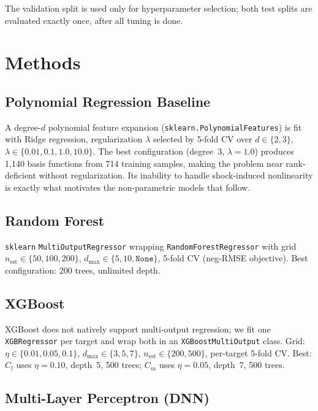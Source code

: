 \documentclass[11pt]{article}
\begin{document}
The validation split is used only for hyperparameter selection; both test
splits are evaluated exactly once, after all tuning is done.

\section{Methods}

\subsection{Polynomial Regression Baseline}

A degree-$d$ polynomial feature expansion
(\texttt{sklearn.PolynomialFeatures}) is fit with Ridge regression,
regularization $\lambda$ selected by 5-fold CV over
$d \in \{2,3\}$, $\lambda \in \{0.01, 0.1, 1.0, 10.0\}$. The best
configuration (degree~3, $\lambda=1.0$) produces 1,140 basis functions
from 714 training samples, making the problem near rank-deficient without
regularization. Its inability to handle shock-induced nonlinearity is exactly what
motivates the non-parametric models that follow.

\subsection{Random Forest}

\texttt{sklearn} \cite{pedregosa2011} \texttt{MultiOutputRegressor} wrapping
\texttt{RandomForestRegressor} \cite{breiman2001} with grid
$n_\text{est} \in \{50,100,200\}$,
$d_\text{max} \in \{5, 10, \texttt{None}\}$, 5-fold CV (neg-RMSE objective).
Best configuration: 200 trees, unlimited depth.

\subsection{XGBoost}

XGBoost \cite{chen2016} does not natively support multi-output regression;
we fit one \texttt{XGBRegressor} per target and wrap both in an
\texttt{XGBoostMultiOutput} class. Grid: $\eta \in \{0.01, 0.05, 0.1\}$,
$d_\text{max} \in \{3,5,7\}$, $n_\text{est} \in \{200,500\}$, per-target
5-fold CV. Best: $C_l$ uses $\eta=0.10$, depth~5, 500 trees; $C_m$ uses
$\eta=0.05$, depth~7, 500 trees.

\subsection{Multi-Layer Perceptron (DNN)}
\end{document}
